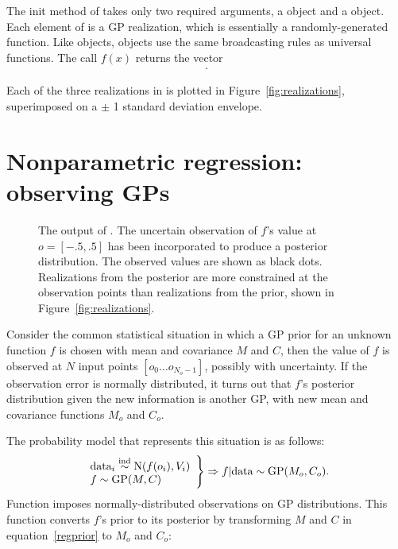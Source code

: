 \documentclass[article]{jss}
\begin{document}
The init method of  takes only two required arguments, a  object and a  object. Each element of  is a GP realization, which is essentially a randomly-generated  function. Like  objects,  objects use the same broadcasting rules as  universal functions. The call $f(x)$ returns the vector
\begin{eqnarray*}
    [f(x_0)\ldots f(x_{N_x-1})].
\end{eqnarray*}

Each of the three realizations in  is plotted in Figure~\ref{fig:realizations}, superimposed on a $\pm$ 1 standard deviation envelope.


\section{Nonparametric regression: observing GPs}\label{sec:observing}

\begin{figure}
    \centering
    \caption{The output of . The uncertain observation of $f$'s value at $o=[-.5,.5]$ has been incorporated to produce a posterior distribution. The observed values are shown as black dots. Realizations from the posterior are more constrained at the observation points than realizations from the prior, shown in Figure~\ref{fig:realizations}.}
    \label{fig:obs}
\end{figure}

Consider the common statistical situation in which a GP prior for an unknown function $f$ is chosen with mean and covariance $M$ and $C$, then the value of $f$ is observed at $N$ input points $[o_0\ldots o_{N_o-1}]$, possibly with uncertainty. If the observation error is normally distributed, it turns out that $f$'s posterior distribution given the new information is another GP, with new mean and covariance functions $M_o$ and $C_o$.

The probability model that represents this situation is as follows:
\begin{equation}
    \label{regprior}
    \left.\begin{array}{l}
        \textup{data}_i \stackrel{\tiny{\textup{ind}}}{\sim} \textup{N}(f(o_i), V_i)\\
        f \sim \textup{GP}(M,C)\\
    \end{array}\right\}\Rightarrow f|\textup{data} \sim \textup{GP}(M_o, C_o).
\end{equation}
Function  imposes normally-distributed observations on GP distributions. This function converts $f$'s prior to its posterior by transforming $M$ and $C$ in equation~\ref{regprior} to $M_o$ and $C_o$:
\end{document}
